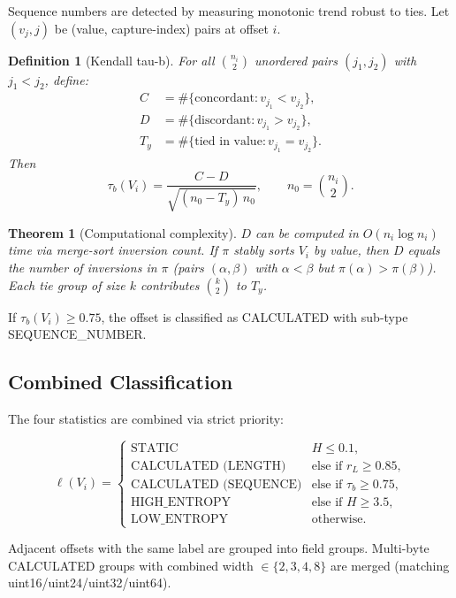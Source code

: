\documentclass[11pt,a4paper]{article}
\newtheorem{definition}{Definition}
\newtheorem{theorem}{Theorem}
\begin{document}
Sequence numbers are detected by measuring monotonic trend robust to ties.
Let $(v_j, j)$ be (value, capture-index) pairs at offset $i$.

\begin{definition}[Kendall tau-b]
For all $\binom{n_i}{2}$ unordered pairs $(j_1, j_2)$ with $j_1 < j_2$,
define:
\begin{align*}
C   &= \#\{\text{concordant}: v_{j_1} < v_{j_2}\}, \\
D   &= \#\{\text{discordant}: v_{j_1} > v_{j_2}\}, \\
T_y &= \#\{\text{tied in value}: v_{j_1} = v_{j_2}\}.
\end{align*}
Then
\[
\tau_b(V_i) = \frac{C - D}{\sqrt{(n_0 - T_y)\, n_0}},\qquad
n_0 = \binom{n_i}{2}.
\]
\end{definition}

\begin{theorem}[Computational complexity]
$D$ can be computed in $O(n_i \log n_i)$ time via merge-sort inversion
count. If $\pi$ stably sorts $V_i$ by value, then $D$ equals the number of
inversions in $\pi$ (pairs $(\alpha, \beta)$ with $\alpha < \beta$ but
$\pi(\alpha) > \pi(\beta)$). Each tie group of size $k$ contributes
$\binom{k}{2}$ to $T_y$.
\end{theorem}

If $\tau_b(V_i) \geq 0.75$, the offset is classified as CALCULATED with
sub-type SEQUENCE\_NUMBER.

\subsection{Combined Classification}

The four statistics are combined via strict priority:

\[
\ell(V_i) =
\begin{cases}
\text{STATIC}                & H \leq 0.1, \\
\text{CALCULATED (LENGTH)}  & \text{else if } r_L \geq 0.85, \\
\text{CALCULATED (SEQUENCE)} & \text{else if } \tau_b \geq 0.75, \\
\text{HIGH\_ENTROPY}         & \text{else if } H \geq 3.5, \\
\text{LOW\_ENTROPY}          & \text{otherwise}.
\end{cases}
\]

Adjacent offsets with the same label are grouped into field groups.
Multi-byte CALCULATED groups with combined width $\in \{2,3,4,8\}$ are
merged (matching uint16/uint24/uint32/uint64).
\end{document}

